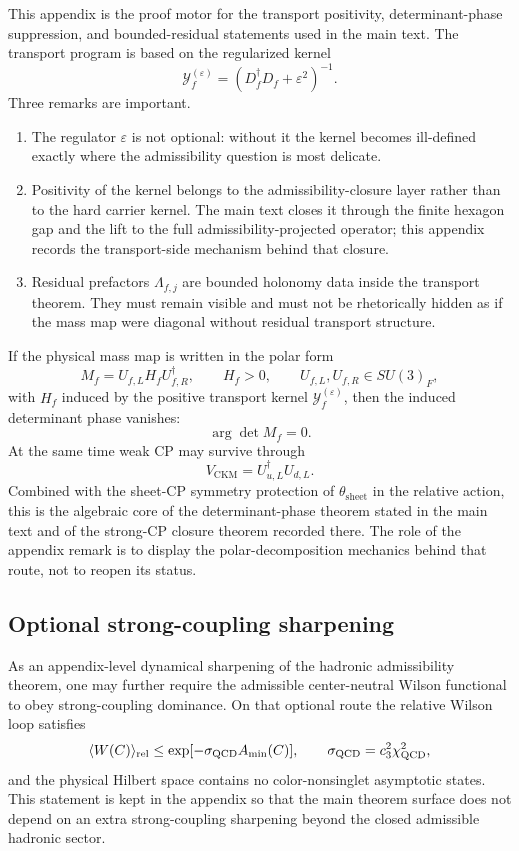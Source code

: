 This appendix is the proof motor for the transport positivity, determinant-phase suppression, and
bounded-residual statements used in the main text. The transport program is based on the regularized kernel
\[
\mathcal Y_f^{(\varepsilon)}=(D_f^\dagger D_f+\varepsilon^2)^{-1}.
\]
Three remarks are important.
\begin{enumerate}[leftmargin=1.5em, topsep=3pt, itemsep=3pt]
    \item The regulator $\varepsilon$ is not optional: without it the kernel becomes ill-defined exactly where the admissibility question is most delicate.
    \item Positivity of the kernel belongs to the admissibility-closure layer rather than to the hard carrier kernel. The main text closes it through the finite hexagon gap and the lift to the full admissibility-projected operator; this appendix records the transport-side mechanism behind that closure.
    \item Residual prefactors $\Lambda_{f,j}$ are bounded holonomy data inside the transport theorem. They must remain visible and must not be rhetorically hidden as if the mass map were diagonal without residual transport structure.
\end{enumerate}

\begin{remark}
If the physical mass map is written in the polar form
\[
M_f=U_{f,L}H_fU_{f,R}^\dagger,
\qquad
H_f>0,
\qquad
U_{f,L},U_{f,R}\in SU(3)_F,
\]
with $H_f$ induced by the positive transport kernel $\mathcal Y_f^{(\varepsilon)}$, then the induced determinant phase vanishes:
\[
\arg\det M_f=0.
\]
At the same time weak CP may survive through
\[
V_{\mathrm{CKM}}=U_{u,L}^\dagger U_{d,L}.
\]
Combined with the sheet-CP symmetry protection of $\theta_{\mathrm{sheet}}$ in the relative action,
this is the algebraic core of the determinant-phase theorem stated in the main text and of the
strong-CP closure theorem recorded there. The role of the appendix remark is to display the
polar-decomposition mechanics behind that route, not to reopen its status.
\end{remark}

\subsection{Optional strong-coupling sharpening}

As an appendix-level dynamical sharpening of the hadronic admissibility theorem, one may further require the
admissible center-neutral Wilson functional to obey strong-coupling dominance. On that optional
route the relative Wilson loop satisfies
\[
\langle W(C)\rangle_{\mathrm{rel}}
\le
\exp[-\sigma_{\mathrm{QCD}} A_{\min}(C)],
\qquad
\sigma_{\mathrm{QCD}}=c_3^2\chi_{\mathrm{QCD}}^2,
\]
and the physical Hilbert space contains no color-nonsinglet asymptotic states. This statement is
kept in the appendix so that the main theorem surface does not depend on an extra strong-coupling
sharpening beyond the closed admissible hadronic sector.

